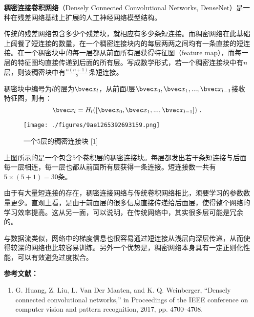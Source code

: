 


\textbf{稠密连接卷积网络}（Densely Connected Convolutional Networks, DenseNet）是一种在残差网络基础上扩展的人工神经网络模型结构。

传统的残差网络包含多少个残差块，就相应有多少条短连接。而稠密网络在此基础上阔餐了短连接的数量，在一个稠密连接块内的每层两两之间均有一条直接的短连接。在一个稠密块中的每一层都从前面所有层获得特征图（feature map），而每一层的特征图均直接传递到后面的所有层。写成数学形式，若一个稠密连接块中有$n$层，则该稠密块中有$\frac{n(n+1)}{2}$条短连接。

稠密块中编号为$l$的层为$\bvec x_l$，从前面$l$层$\bvec x_0, \bvec x_1, ..., \bvec x_{l-1}$接收特征图，则有：
\begin{equation}
\bvec x_l=H_l([\bvec x_0, \bvec x_1, ..., \bvec x_{l-1}])~.
\end{equation}

\begin{figure}[ht]
\centering
\texttt{[image: ./figures/9ae1265392693159.png]}
\caption{一个5层的稠密连接块 [1]} \label{fig_DensNe_1}
\end{figure}
上图所示的是一个包含$5$个卷积层的稠密连接块。每层都发出若干条短连接与后面每一层相连，每一层也都从前面所有层获得一条连接。短连接数一共有$5\times(5+1)=30$条。

由于有大量短连接的存在，稠密连接网络与传统卷积网络相比，须要学习的参数数量更少。直观上看，是由于前面层的很多信息直接传递给后面层，使得整个网络的学习效率提高。这从另一面，可以说明，在传统网络中，其实很多层可能是冗余的。

与数据流类似，网络中的梯度信息也很容易通过短连接从浅层向深层传递，从而使得较深的网络也比较容易训练。另外一个优势是，稠密网络本身具有一定正则化性能，可以有效避免过度拟合。


\textbf{参考文献：}
\begin{enumerate}
\item G. Huang, Z. Liu, L. Van Der Maaten, and K. Q. Weinberger, “Densely connected convolutional networks,” in Proceedings of the IEEE conference on computer vision and pattern recognition, 2017, pp. 4700–4708.
\end{enumerate}